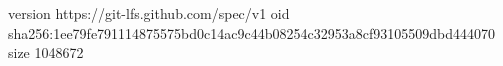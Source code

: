 version https://git-lfs.github.com/spec/v1
oid sha256:1ee79fe791114875575bd0c14ac9c44b08254c32953a8cf93105509dbd444070
size 1048672
